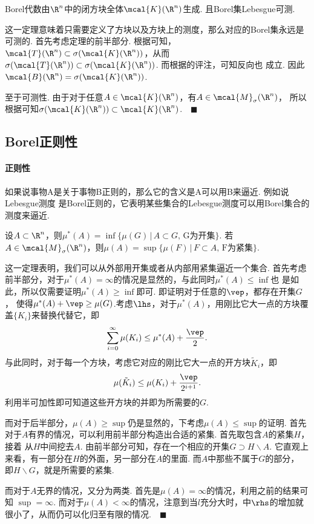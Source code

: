   \begin{thm}
    Borel代数由$\R^n$中的闭方块全体$\mcal{K}(\R^n)$生成. 且Borel集Lebesgue可测.
  \end{thm}
  \remark
    这一定理意味着只需要定义了方块以及方块上的测度，那么对应的Borel集永远是可测的.
  \proof
    首先考虑定理的前半部分. 根据可知，$\mcal{T}(\R^n)
    \subset\sigma(\mcal{K}(\R^n))$，从而$\sigma(\mcal{T}(\R^n))\subset
    \sigma(\mcal{K}(\R^n))$. 而根据的评注，可知反向也
    成立. 因此$\mcal{B}(\R^n) = \sigma(\mcal{K}(\R^n))$.\par
    至于可测性. 由于对于任意$A\in\mcal{K}(\R^n)$，有$A\in\mcal{M}_\sigma(\R^n)$，
    所以根据可知$\sigma(\mcal{K}(\R^n))\subset
    \mcal{K}(\R^n)$.$\quad\blacksquare$

\subsection{Borel正则性}

  \paragraph{正则性}
    如果说事物A是关于事物B正则的，那么它的含义是A可以用B来逼近. 例如说Lebesgue测度
    是Borel正则的，它表明某些集合的Lebesgue测度可以用Borel集合的测度来逼近.

  \begin{thm}
    \label{thm: Borel正则性}
    设$A\subset\R^n$，则$\mu^*(A)=\inf\{\mu(G)\,|\,A\subset G,\,
    \text{G为开集}\}$. 若$A\in\mcal{M}_\sigma(\R^n)$，则$\mu(A)=
    \sup\{\mu(F)\,|\,F\subset A,\,\text{F为紧集}\}$.
  \end{thm}
  \remark
    这一定理表明，我们可以从外部用开集或者从内部用紧集逼近一个集合.
  \proof
    首先考虑前半部分，对于$\mu^*(A)=\infty$的情况是显然的，与此同时$\mu^*(A)\le\inf$也
    是如此，所以仅需要证明$\mu^*(A)\ge\inf$即可. 即证明对于任意的$\vep$，都存在开集$G$，
    使得$\mu^*(A)+\vep\ge\mu(G)$.考虑$\lhs$，对于$\mu^*(A)$，用刚比它大一点的方块覆
    盖$\{K_i\}$来替换代替它，即
    \[
      \sum_{i=0}^\infty\mu(K_i) \le \mu^*(A) + \frac{\vep}{2}.
    \]
    与此同时，对于每一个方块，考虑它对应的刚比它大一点的开方块$\tilde{K}_i$，即
    \[
      \mu(\tilde{K}_i) \le \mu(K_i) + \frac{\vep}{2^{i+1}}.
    \]
    利用半可加性即可知道这些开方块的并即为所需要的$G$.\par
    而对于后半部分，$\mu(A)\ge\sup$仍是显然的，下考虑$\mu(A)\le\sup$的证明. 首先
    对于$A$有界的情况，可以利用前半部分构造出合适的紧集. 首先取包含$A$的紧集$H$，接着
    从$H$中间挖去$A$. 由前半部分可知，存在一个相应的开集$G\supset H\backslash A$.
    它直观上来看，有一部分在$H$的外面，另一部分在$A$的里面. 而$A$中那些不属于$G$的部分，
    即$H\backslash G$，就是所需要的紧集. \par
    而对于$A$无界的情况，又分为两类. 首先是$\mu(A)=\infty$的情况，利用之前的结果可知
    $\sup=\infty$. 而对于$\mu(A)<\infty$的情况，注意到当$l$充分大时，中$\rhs$的增加就很小了，从而仍可以化归至有限的情况.$\quad\blacksquare$

